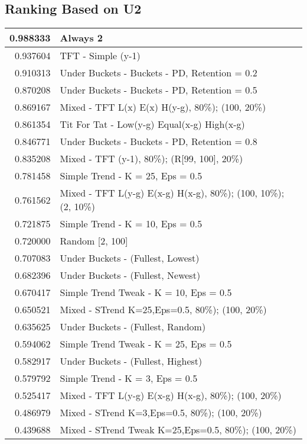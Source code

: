 \begin{table}[!hbtp]
\subsection{Ranking Based on U2}
\begin{footnotesize}
\begin{tabular}{|r|l|}\hline  \label{U3results}
0.988333 & Always 2\\ \hline
0.937604 & TFT - Simple (y-1)\\ \hline
0.910313 & Under Buckets - Buckets - PD, Retention = 0.2\\ \hline
0.870208 & Under Buckets - Buckets - PD, Retention = 0.5\\ \hline
0.869167 & Mixed - {TFT L(x) E(x) H(y-g), 80\%); (100, 20\%)}\\ \hline
0.861354 & Tit For Tat - Low(y-g) Equal(x-g) High(x-g)\\ \hline
0.846771 & Under Buckets - Buckets - PD, Retention = 0.8\\ \hline
0.835208 & Mixed - {TFT (y-1), 80\%); (R[99, 100], 20\%)}\\ \hline
0.781458 & Simple Trend - K = 25, Eps = 0.5\\ \hline
0.761562 & Mixed - {TFT L(y-g) E(x-g) H(x-g), 80\%); (100, 10\%); (2, 10\%)}\\ \hline
0.721875 & Simple Trend - K = 10, Eps = 0.5\\ \hline
0.720000 & Random [2, 100]\\ \hline
0.707083 & Under Buckets - (Fullest, Lowest)\\ \hline
0.682396 & Under Buckets - (Fullest, Newest)\\ \hline
0.670417 & Simple Trend Tweak - K = 10, Eps = 0.5\\ \hline
0.650521 & Mixed - {STrend K=25,Eps=0.5, 80\%); (100, 20\%)}\\ \hline
0.635625 & Under Buckets - (Fullest, Random)\\ \hline
0.594062 & Simple Trend Tweak - K = 25, Eps = 0.5\\ \hline
0.582917 & Under Buckets - (Fullest, Highest)\\ \hline
0.579792 & Simple Trend - K = 3, Eps = 0.5\\ \hline
0.525417 & Mixed - {TFT L(y-g) E(x-g) H(x-g), 80\%); (100, 20\%)}\\ \hline
0.486979 & Mixed - {STrend K=3,Eps=0.5, 80\%); (100, 20\%)}\\ \hline
0.439688 & Mixed - {STrend Tweak K=25,Eps=0.5, 80\%); (100, 20\%)}\\ \hline

\end{tabular}
\end{footnotesize}
\end{table}
